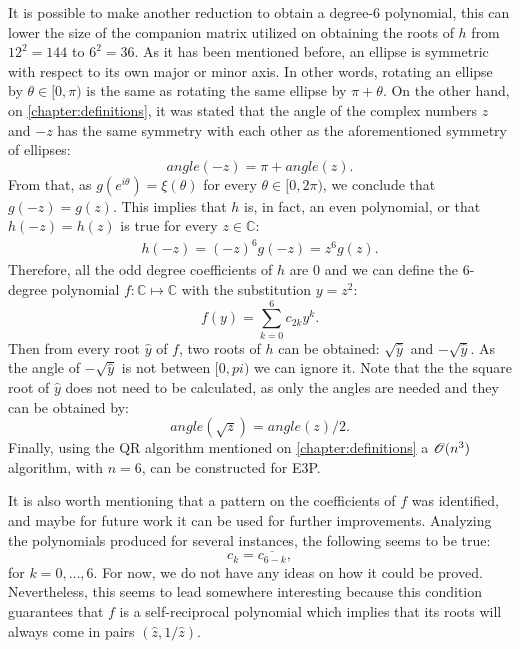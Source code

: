It is possible to make another reduction to obtain a degree-$6$ polynomial, this can lower the size of the companion matrix utilized on obtaining the roots of $h$ from $12^2=144$ to $6^2=36$.
As it has been mentioned before, an ellipse is symmetric with respect to its own major or minor axis. 
In other words, rotating an ellipse by $\theta \in [0, \pi)$ is the same as rotating the same ellipse by $\pi + \theta$.
On the other hand, on \autoref{chapter:definitions}, it was stated that the angle of the complex numbers $z$ and $-z$ has the same symmetry with each other as the aforementioned symmetry of ellipses:
\begin{equation*}
angle(-z) = \pi + angle(z).
\end{equation*}
From that, as $g(e^{i\theta})=\xi(\theta)$ for every $\theta \in [0, 2\pi)$, we conclude that $g(-z)=g(z)$. This implies that $h$ is, in fact, an even polynomial, or that $h(-z) = h(z)$ is true for every $z\in\mathbb{C}$:
\begin{align}
h(-z) = (-z)^6g(-z) = z^6g(z).
\end{align}
Therefore, all the odd degree coefficients of $h$ are $0$ and we can define the $6$-degree polynomial $f : \mathbb{C} \mapsto \mathbb{C}$ with the substitution $y=z^2$:
\begin{equation}
f(y) = \sum_{k=0}^{6} c_{2k} y^k.
\end{equation}
Then from every root $\hat{y}$ of $f$, two roots of $h$ can be obtained: $\sqrt{\hat{y}}$ and $-\sqrt{\hat{y}}$. As the angle of $-\sqrt{\hat{y}}$ is not between $[0, pi)$ we can ignore it. Note that the the square root of $\hat{y}$ does not need to be calculated, as only the angles are needed and they can be obtained by:
\begin{equation}
angle(\sqrt{z}) = angle(z)/2.
\end{equation}
Finally, using the QR algorithm mentioned on \autoref{chapter:definitions} a $\mathscr{O}(n^3)$ algorithm, with $n=6$, can be constructed for E3P.

It is also worth mentioning that a pattern on the coefficients of $f$ was identified, and maybe for future work it can be used for further improvements. Analyzing the polynomials produced for several instances, the following seems to be true:
\begin{equation}
c_k = \overline{c_{6-k}},
\end{equation}
for $k=0, \dots, 6$. For now, we do not have any ideas on how it could be proved. Nevertheless, this seems to lead somewhere interesting because this condition guarantees that $f$ is a self-reciprocal polynomial which implies that its roots will always come in pairs $(\hat{z}, 1/\hat{z})$.

